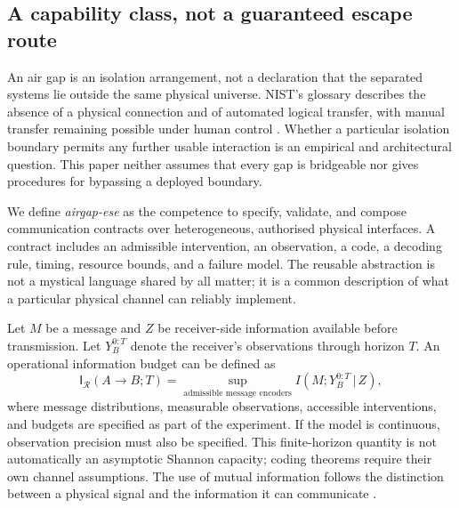\documentclass[11pt,a4paper]{article}
\theoremstyle{definition}
\theoremstyle{remark}
\newcommand{\calR}{\mathcal{R}}
\newcommand{\given}{\,\vert\,}
\begin{document}
\subsection{A capability class, not a guaranteed escape route}
An air gap is an isolation arrangement, not a declaration that the separated systems lie outside the same physical universe. NIST's glossary describes the absence of a physical connection and of automated logical transfer, with manual transfer remaining possible under human control \citep{nist}. Whether a particular isolation boundary permits any further usable interaction is an empirical and architectural question. This paper neither assumes that every gap is bridgeable nor gives procedures for bypassing a deployed boundary.

We define \emph{airgap-ese} as the competence to specify, validate, and compose communication contracts over heterogeneous, authorised physical interfaces. A contract includes an admissible intervention, an observation, a code, a decoding rule, timing, resource bounds, and a failure model. The reusable abstraction is not a mystical language shared by all matter; it is a common description of what a particular physical channel can reliably implement.

Let $M$ be a message and $Z$ be receiver-side information available before transmission. Let $Y_B^{0:T}$ denote the receiver's observations through horizon $T$. An operational information budget can be defined as
\begin{equation}\label{eq:infobudget}
 \mathsf I_{\calR}(A\!\to\!B;T)
 =\sup_{\text{admissible message encoders}}
 I(M;Y_B^{0:T}\given Z),
\end{equation}
where message distributions, measurable observations, accessible interventions, and budgets are specified as part of the experiment. If the model is continuous, observation precision must also be specified. This finite-horizon quantity is not automatically an asymptotic Shannon capacity; coding theorems require their own channel assumptions. The use of mutual information follows the distinction between a physical signal and the information it can communicate \citep{shannon}.
\end{document}
